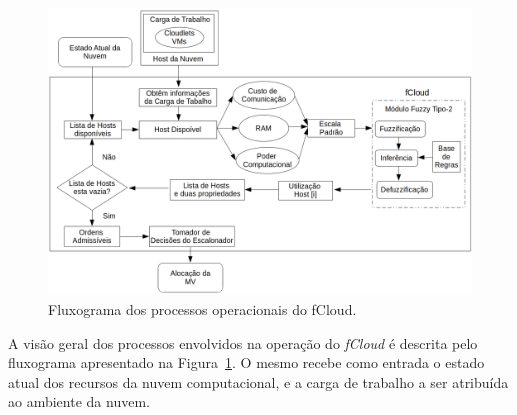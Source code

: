 \documentclass[tcc,capa]{texufpel}
\begin{document}
\begin{figure}[h]
\centering
\includegraphics[scale=0.45]{images/fluxograma_int_flbcc_ptbr.png} 
\caption{Fluxograma dos processos operacionais do fCloud.}
\label{Fluxograma_fCloud}
\end{figure}

A visão geral dos processos envolvidos na operação do \emph{fCloud} é descrita pelo fluxograma apresentado na Figura~\ref{Fluxograma_fCloud}. O mesmo recebe como entrada o estado atual dos recursos da nuvem computacional, e a carga de trabalho a ser atribuída  ao ambiente da nuvem.
\end{document}
